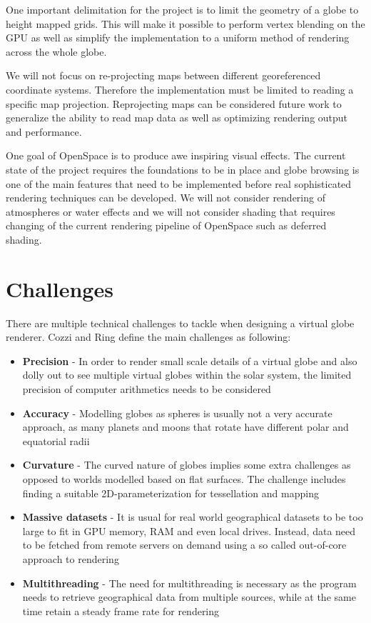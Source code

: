 One important delimitation for the project is to limit the geometry of a globe to height mapped grids. This will make it possible to perform vertex blending on the GPU as well as simplify the implementation to a uniform method of rendering across the whole globe.

We will not focus on re-projecting maps between different georeferenced coordinate systems. Therefore the implementation must be limited to reading a specific map projection. Reprojecting maps can be considered future work to generalize the ability to read map data as well as optimizing rendering output and performance.

One goal of OpenSpace is to produce awe inspiring visual effects. The current state of the project requires the foundations to be in place and globe browsing is one of the main features that need to be implemented before real sophisticated rendering techniques can be developed. We will not consider rendering of atmospheres or water effects and we will not consider shading that requires changing of the current rendering pipeline of OpenSpace such as deferred shading.

\section{Challenges}

There are multiple technical challenges to tackle when designing a virtual globe renderer. Cozzi and Ring \cite{cozzi11} define the main challenges as following:

\begin{itemize}

\item \textbf{Precision} - In order to render small scale details of a virtual globe and also dolly out to see multiple virtual globes within the solar system, the limited precision of computer arithmetics needs to be considered
\item \textbf{Accuracy} - Modelling globes as spheres is usually not a very accurate approach, as many planets and moons that rotate have different polar and equatorial radii
\item \textbf{Curvature} - The curved nature of globes implies some extra challenges as opposed to worlds modelled based on flat surfaces. The challenge includes finding a suitable 2D-parameterization for tessellation and mapping
\item \textbf{Massive datasets} - It is usual for real world geographical datasets to be too large to fit in GPU memory, RAM and even local drives. Instead, data need to be fetched from remote servers on demand using a so called out-of-core approach to rendering
\item \textbf{Multithreading} - The need for multithreading is necessary as the program needs to retrieve geographical data from multiple sources, while at the same time retain a steady frame rate for rendering

\end{itemize}

